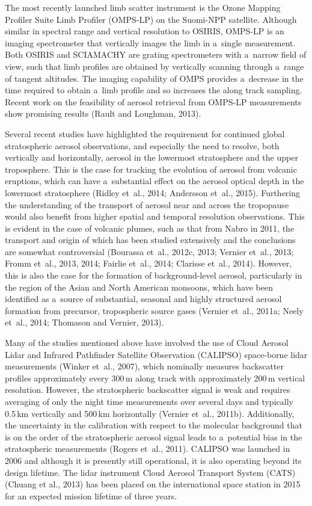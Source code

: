 \documentclass[amtd, online, hvmath]{copernicus}
\begin{document}
The most recently launched limb scatter instrument is the Ozone
Mapping Profiler Suite Limb Profiler (OMPS-LP) on the Suomi-NPP
satellite. Although similar in spectral range and vertical resolution
to OSIRIS, OMPS-LP is an imaging spectrometer that vertically images
the limb in a~single measurement. Both OSIRIS and SCIAMACHY are
grating spectrometers with a~narrow field of view, such that limb
profiles are obtained by vertically scanning through a~range of
tangent altitudes. The imaging capability of OMPS provides a~decrease
in the time required to obtain a~limb profile and so increases the
along track sampling. Recent work on the feasibility of aerosol
retrieval from OMPS-LP measurements show promising results (Rault and
Loughman, 2013).

Several recent studies have highlighted the requirement for continued global
stratospheric aerosol observations, and especially the need to resolve, both
vertically and horizontally, aerosol in the lowermost stratosphere and the
upper troposphere. This is the case for tracking the evolution of aerosol
from volcanic eruptions, which can have a~substantial effect on the aerosol
optical depth in the lowermost stratosphere (Ridley et~al., 2014; Andersson
et~al., 2015). Furthering the understanding of the transport of aerosol near
and across the tropopause would also benefit from higher spatial and temporal
resolution observations. This is evident in the case of volcanic plumes, such
as that from Nabro in 2011, the transport and origin of which has been
studied extensively and the conclusions are somewhat controversial (Bourassa et~al., 2012c,
2013; Vernier et~al., 2013; Fromm et~al., 2013, 2014; Fairlie et~al., 2014;
Clarisse et~al., 2014). However, this is also the case for the formation of
background-level aerosol, particularly in the region of the Asian and North
American monsoons, which have been identified as a~source of substantial,
seasonal and highly structured aerosol formation from precursor, tropospheric
source gases (Vernier et~al., 2011a; Neely et~al., 2014; Thomason and
Vernier, 2013).

Many of the studies mentioned above have involved the use of Cloud
Aerosol Lidar and Infrared Pathfinder Satellite Observation (CALIPSO)
space-borne lidar measurements (Winker et~al., 2007), which nominally
measures backscatter profiles approximately every 300\,\unit{m} along
track with approximately 200\,\unit{m} vertical resolution. However,
the stratospheric backscatter signal is weak and requires averaging of
only the night time measurements over several days and typically
0.5\,\unit{km} vertically and 500\,\unit{km} horizontally (Vernier
et~al., 2011b). Additionally, the uncertainty in the calibration with
respect to the molecular background that is on the order of the
stratospheric aerosol signal leads to a~potential bias in the
stratospheric measurements (Rogers et~al., 2011). CALIPSO was launched
in 2006 and although it is presently still operational, it is also
operating beyond its design lifetime. The lidar instrument Cloud Aerosol Transport System (CATS) (Chuang et al., 2013) has been placed on the international space station in 2015 for an expected mission lifetime of three years.
\end{document}
